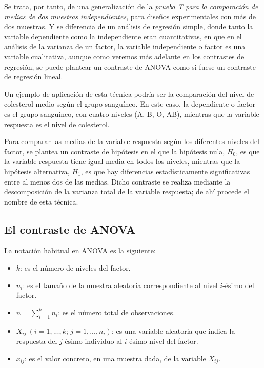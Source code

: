 \documentclass[
  a4paper,
]{scrreport}
\providecommand{\tightlist}{%
  \setlength{\itemsep}{0pt}\setlength{\parskip}{0pt}}\usepackage{longtable,booktabs,array}
\theoremstyle{plain}
\theoremstyle{definition}
\theoremstyle{definition}
\theoremstyle{remark}
\begin{document}
Se trata, por tanto, de una generalización de la \emph{prueba T para la
comparación de medias de dos muestras independientes}, para diseños
experimentales con más de dos muestras. Y se diferencia de un análisis
de regresión simple, donde tanto la variable dependiente como la
independiente eran cuantitativas, en que en el análisis de la varianza
de un factor, la variable independiente o factor es una variable
cualitativa, aunque como veremos más adelante en los contrastes de
regresión, se puede plantear un contraste de ANOVA como si fuese un
contraste de regresión lineal.

Un ejemplo de aplicación de esta técnica podría ser la comparación del
nivel de colesterol medio según el grupo sanguíneo. En este caso, la
dependiente o factor es el grupo sanguíneo, con cuatro niveles (A, B, O,
AB), mientras que la variable respuesta es el nivel de colesterol.

Para comparar las medias de la variable respuesta según los diferentes
niveles del factor, se plantea un contraste de hipótesis en el que la
hipótesis nula, \(H_0\), es que la variable respuesta tiene igual media
en todos los niveles, mientras que la hipótesis alternativa, \(H_1\), es
que hay diferencias estadísticamente significativas entre al menos dos
de las medias. Dicho contraste se realiza mediante la descomposición de
la varianza total de la variable respuesta; de ahí procede el nombre de
esta técnica.

\subsection{El contraste de ANOVA}\label{el-contraste-de-anova}

La notación habitual en ANOVA es la siguiente:

\begin{itemize}
\tightlist
\item
  \(k\): es el número de niveles del factor.
\item
  \(n_i\): es el tamaño de la muestra aleatoria correspondiente al nivel
  \(i\)-ésimo del factor.
\item
  \(n = \sum_{i = 1}^k {n_i}\): es el número total de observaciones.
\item
  \(X_{ij}\ (i = 1,...,k;\,j = 1,...,n_i)\): es una variable aleatoria
  que indica la respuesta del \(j\)-ésimo individuo al \(i\)-ésimo nivel
  del factor.
\item
  \(x_{ij}\): es el valor concreto, en una muestra dada, de la variable
  \(X_{ij}\).
\end{itemize}
\end{document}
